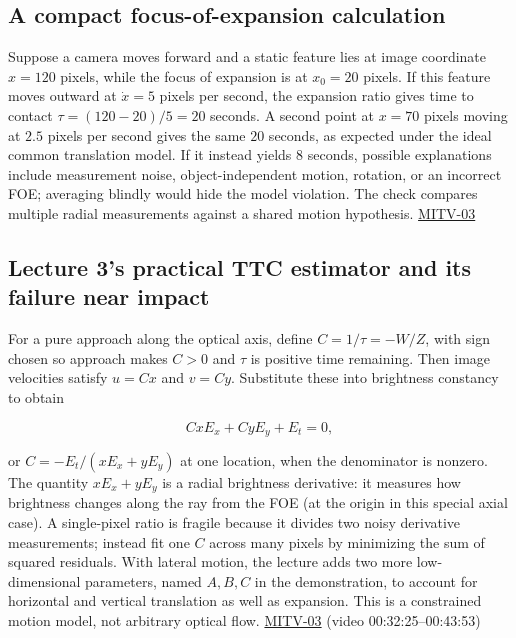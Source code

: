 \subsection{A compact focus-of-expansion calculation}\label{04-visual-computing-ii-ch030-a-compact-focus-of-expansion-calculation}

Suppose a camera moves forward and a static feature lies at image coordinate \(x=120\) pixels, while the focus of expansion is at \(x_0=20\) pixels. If this feature moves outward at \(\dot x=5\) pixels per second, the expansion ratio gives time to contact \(\tau=(120-20)/5=20\) seconds. A second point at \(x=70\) pixels moving at \(2.5\) pixels per second gives the same \(20\) seconds, as expected under the ideal common translation model. If it instead yields \(8\) seconds, possible explanations include measurement noise, object-independent motion, rotation, or an incorrect FOE; averaging blindly would hide the model violation. The check compares multiple radial measurements against a shared motion hypothesis. \hyperref[04-visual-computing-ii-ch036-mitv-03---time-to-contact-focus-of-expansion-direct-motion-vision-methods-noise-gain]{MITV-03}

\subsection{Lecture 3's practical TTC estimator and its failure near impact}\label{04-visual-computing-ii-ch030-lecture-3s-practical-ttc-estimator-and-its-failure-near-impact}

For a pure approach along the optical axis, define \(C=1/\tau=-W/Z\), with sign chosen so approach makes \(C>0\) and \(\tau\) is positive time remaining. Then image velocities satisfy \(u=Cx\) and \(v=Cy\). Substitute these into brightness constancy to obtain

\[
CxE_x+CyE_y+E_t=0,
\]

or \(C=-E_t/(xE_x+yE_y)\) at one location, when the denominator is nonzero. The quantity \(xE_x+yE_y\) is a radial brightness derivative: it measures how brightness changes along the ray from the FOE (at the origin in this special axial case). A single-pixel ratio is fragile because it divides two noisy derivative measurements; instead fit one \(C\) across many pixels by minimizing the sum of squared residuals. With lateral motion, the lecture adds two more low-dimensional parameters, named \(A,B,C\) in the demonstration, to account for horizontal and vertical translation as well as expansion. This is a constrained motion model, not arbitrary optical flow. \hyperref[04-visual-computing-ii-ch036-mitv-03---time-to-contact-focus-of-expansion-direct-motion-vision-methods-noise-gain]{MITV-03} (video 00:32:25--00:43:53)

